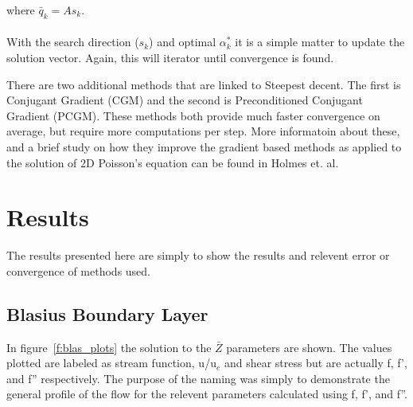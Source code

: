 \documentclass[]{aiaa-tc}%
\begin{document}
where $\bar q_k = A s_k$.
\\\\
With the search direction ($s_k$) and optimal $\alpha_k^*$ it is a simple matter
to update the solution vector. Again, this will iterator until convergence is
found.

There are two additional methods that are linked to Steepest decent. The first is
Conjugant Gradient (CGM) and the second is Preconditioned Conjugant Gradient (PCGM).
These methods both provide much faster convergence on average, but require more computations
per step. More informatoin about these, and a brief study on how they improve the
gradient based methods as applied to the solution of 2D Poisson's equation
can be found in Holmes et. al.\cite{holmes:07bk}

\FloatBarrier\section{Results}
The results presented here are simply to show the results and relevent error or
convergence of methods used. 

\FloatBarrier\subsection{Blasius Boundary Layer}
In figure~\ref{f:blas_plots} the solution to the $\bar Z$ parameters are shown. 
The values plotted are labeled as stream function, u/u$_e$ and shear stress but are
actually f, f', and f'' respectively. The purpose of the naming was simply to 
demonstrate the general profile of the flow for the relevent parameters calculated 
using f, f', and f''.
\end{document}
